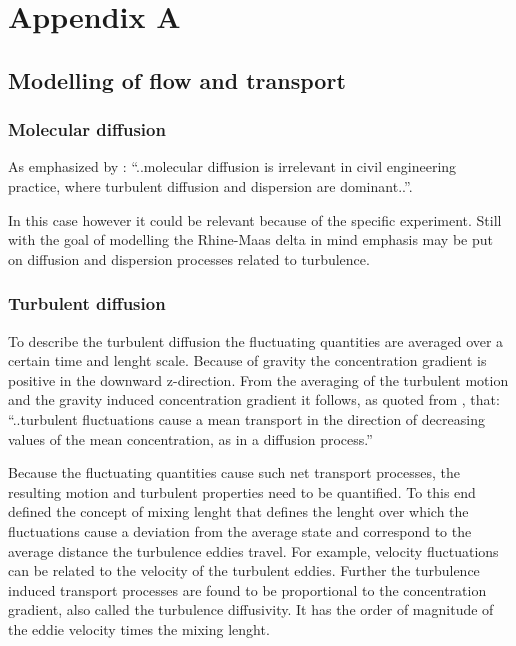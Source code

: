 \chapter{Appendix A}\label{appendix-a}

\section{Modelling of flow and
transport}\label{modelling-of-flow-and-transport}

\subsection{Molecular diffusion}\label{molecular-diffusion}

As emphasized by \citep[p194]{Battjes2017}: ``..molecular diffusion is
irrelevant in civil engineering practice, where turbulent diffusion and
dispersion are dominant..''.

In this case however it could be relevant because of the specific
experiment. Still with the goal of modelling the Rhine-Maas delta in
mind emphasis may be put on diffusion and dispersion processes related
to turbulence.

\subsection{Turbulent diffusion}\label{turbulent-diffusion}

To describe the turbulent diffusion the fluctuating quantities are
averaged over a certain time and lenght scale. Because of gravity the
concentration gradient is positive in the downward z-direction. From the
averaging of the turbulent motion and the gravity induced concentration
gradient it follows, as quoted from \citep[p.197]{Vuik2007}, that:
``..turbulent fluctuations cause a mean transport in the direction of
decreasing values of the mean concentration, as in a diffusion
process.''

Because the fluctuating quantities cause such net transport processes,
the resulting motion and turbulent properties need to be quantified. To
this end \citet{Prandtl1925} defined the concept of mixing lenght that
defines the lenght over which the fluctuations cause a deviation from
the average state and correspond to the average distance the turbulence
eddies travel. For example, velocity fluctuations can be related to the
velocity of the turbulent eddies. Further the turbulence induced
transport processes are found to be proportional to the concentration
gradient, also called the turbulence diffusivity. It has the order of
magnitude of the eddie velocity times the mixing lenght.

